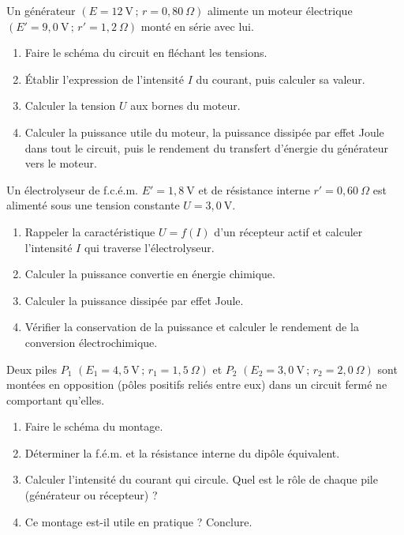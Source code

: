 \documentclass[11pt]{article}
\begin{document}
\begin{exercice}
Un générateur $(E = 12~\text{V} \,;\, r = 0,80~\Omega)$ alimente un moteur électrique $(E' = 9,0~\text{V} \,;\, r' = 1,2~\Omega)$ monté en série avec lui.
\begin{enumerate}
\item Faire le schéma du circuit en fléchant les tensions.
\item Établir l'expression de l'intensité $I$ du courant, puis calculer sa valeur.
\item Calculer la tension $U$ aux bornes du moteur.
\item Calculer la puissance utile du moteur, la puissance dissipée par effet Joule dans tout le circuit, puis le rendement du transfert d'énergie du générateur vers le moteur.
\end{enumerate}
\end{exercice}

\begin{exercice}[Électrolyseur]
Un électrolyseur de f.c.é.m. $E' = 1,8~\text{V}$ et de résistance interne $r' = 0,60~\Omega$ est alimenté sous une tension constante $U = 3,0~\text{V}$.
\begin{enumerate}
\item Rappeler la caractéristique $U = f(I)$ d'un récepteur actif et calculer l'intensité $I$ qui traverse l'électrolyseur.
\item Calculer la puissance convertie en énergie chimique.
\item Calculer la puissance dissipée par effet Joule.
\item Vérifier la conservation de la puissance et calculer le rendement de la conversion électrochimique.
\end{enumerate}
\end{exercice}

\begin{exercice}
Deux piles $P_1$ $(E_1 = 4,5~\text{V} \,;\, r_1 = 1,5~\Omega)$ et $P_2$ $(E_2 = 3,0~\text{V} \,;\, r_2 = 2,0~\Omega)$ sont montées en opposition (pôles positifs reliés entre eux) dans un circuit fermé ne comportant qu'elles.
\begin{enumerate}
\item Faire le schéma du montage.
\item Déterminer la f.é.m. et la résistance interne du dipôle équivalent.
\item Calculer l'intensité du courant qui circule. Quel est le rôle de chaque pile (générateur ou récepteur) ?
\item Ce montage est-il utile en pratique ? Conclure.
\end{enumerate}
\end{exercice}
\end{document}
